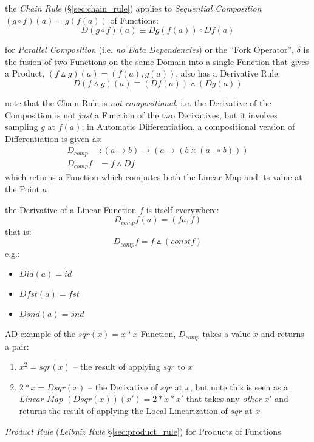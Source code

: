 the \emph{Chain Rule} (\S\ref{sec:chain_rule}) applies to \emph{Sequential
  Composition} $(g \circ f)(a) = g (f (a))$ of Functions:
\[
  D(g \circ f) (a) \equiv D g (f(a)) \circ D f (a)
\]

for \emph{Parallel Composition} (i.e. \emph{no Data Dependencies}) or the ``Fork
Operator'', $\delta$ is the fusion of two Functions on the same Domain into a
single Function that gives a Product, $(f \vartriangle g)(a) = (f(a), g(a))$,
also has a Derivative Rule:
\[
  D(f \vartriangle g)(a) \equiv (D f (a)) \vartriangle (D g (a))
\]

note that the Chain Rule is \emph{not compositional}, i.e. the Derivative of the
Composition is not \emph{just} a Function of the two Derivatives, but it
involves sampling $g$ at $f(a)$; in Automatic Differentiation, a compositional
version of Differentiation is given as:
\begin{align*}
  D_{comp}   & : (a \rightarrow b)
    \rightarrow (a \rightarrow (b \times (a \multimap b))) \\
  D_{comp} f & = f \vartriangle D f
\end{align*}
which returns a Function which computes both the Linear Map and its value at the
Point $a$

the Derivative of a Linear Function $f$ is itself everywhere:
\[
  D_{comp} f(a) = (f a, f)
\]
that is:
\[
  D_{comp} f = f \vartriangle (const f)
\]
e.g.:
\begin{itemize}
  \item $D id (a) = id$
  \item $D fst (a) = fst$
  \item $D snd (a) = snd$
\end{itemize}

AD example of the $sqr(x) = x * x$ Function, $D_{comp}$ takes a value $x$ and
returns a pair:
\begin{enumerate}
  \item $x^2 = sqr(x)$ -- the result of applying $sqr$ to $x$
  \item $2*x = D sqr(x)$ -- the Derivative of $sqr$ at $x$, but note this is
    seen as a \emph{Linear Map} $(D sqr(x)) (x') = 2 * x * x'$ that takes any
    \emph{other} $x'$ and returns the result of applying the Local Linearization
    of $sqr$ at $x$
\end{enumerate}

\emph{Product Rule} (\emph{Leibniz Rule} \S\ref{sec:product_rule}) for Products
of Functions

